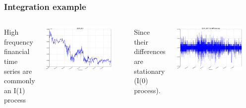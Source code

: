 \documentclass{beamer}
\begin{document}
\begin{frame}
\frametitle{Integration example}
\begin{columns}
\column[t]{5cm}
High frequency financial time series are commonly an I(1) process 
\begin{center}
\includegraphics[width=0.85\textwidth]{img/EURUSD}
\end{center}
\column[t]{5cm}
Since their differences are stationary (I(0) process).
\newline
\begin{center}
\includegraphics[width=0.85\textwidth]{img/DEURUSD}
\end{center}
\end{columns}
\end{frame}
\end{document}
